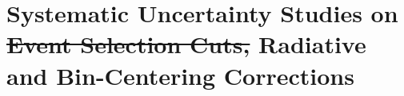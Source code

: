 \documentclass[aps, prl]{revtex4-2}  %
\providecommand{\DIFdeltex}[1]{{\protect\color{red}\sout{#1}}}                      %
\providecommand{\DIFdelbegin}{} %
\providecommand{\DIFdelend}{} %
\providecommand{\DIFdel}[1]{\texorpdfstring{\DIFdeltex{#1}}{}} %
\newcommand{\DIFscaledelfig}{0.5}
\newlength{\DIFdelgraphicswidth} %
\newlength{\DIFdelgraphicsheight} %
\newcommand{\DIFdelincludegraphics}[2][]{%
\sbox{\DIFdelgraphicsbox}{\DIFOincludegraphics[#1]{#2}}%
\settoboxwidth{\DIFdelgraphicswidth}{\DIFdelgraphicsbox} %
\settoboxtotalheight{\DIFdelgraphicsheight}{\DIFdelgraphicsbox} %
\scalebox{\DIFscaledelfig}{%
\parbox[b]{\DIFdelgraphicswidth}{\usebox{\DIFdelgraphicsbox}\\[-\baselineskip] \rule{\DIFdelgraphicswidth}{0em}}\llap{\resizebox{\DIFdelgraphicswidth}{\DIFdelgraphicsheight}{%
\setlength{\unitlength}{\DIFdelgraphicswidth}%
\begin{picture}(1,1)%
\thicklines\linethickness{2pt} %
{\color[rgb]{1,0,0}\put(0,0){\framebox(1,1){}}}%
{\color[rgb]{1,0,0}\put(0,0){\line( 1,1){1}}}%
{\color[rgb]{1,0,0}\put(0,1){\line(1,-1){1}}}%
\end{picture}%
}\hspace*{3pt}}} %
} %
\DeclareRobustCommand{\DIFdelbegin}{\DIFOdelbegin \let\includegraphics\DIFdelincludegraphics} %
\DeclareRobustCommand{\DIFdelend}{\DIFOaddend \let\includegraphics\DIFOincludegraphics} %
\begin{document}
\section{\large Systematic Uncertainty Studies on \DIFdelbegin \DIFdel{Event Selection Cuts, }\DIFdelend Radiative and Bin-Centering Corrections }
\end{document}
